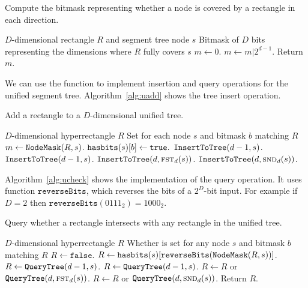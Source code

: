 \documentclass[english,gradu]{tktltiki2018}
\begin{document}
\begin{algorithm}
\caption{Compute the bitmask representing whether a node is covered by a rectangle in each direction.}\label{alg:maskof}
\begin{algorithmic}
\Require $D$-dimensional rectangle $R$ and segment tree node $s$
\Ensure Bitmask of $D$ bits representing the dimensions where $R$ fully covers $s$
	\State $m\gets 0$.
			\State $m\gets m | 2^{d-1}$.
		\EndIf
	\EndFor
	\State Return $m$.
\EndProcedure
\end{algorithmic}
\end{algorithm}

We can use the \maskoff function to implement insertion and query operations for the unified segment tree.
Algorithm~\ref{alg:uadd} shows the tree insert operation.

\begin{algorithm}
\caption{Add a rectangle to a $D$-dimensional unified tree.}\label{alg:uadd}
\begin{algorithmic}
\Require $D$-dimensional hyperrectangle $R$
\Ensure Set  for each node $s$ and bitmask $b$ matching $R$
		\State $m\gets\texttt{NodeMask}(R,s)$.
				\State $\texttt{hasbits}(s)[b]\gets\texttt{true}.$
			\EndIf
		\EndFor
		\State $\texttt{InsertToTree}(d-1,s)$.
		\State $\texttt{InsertToTree}(d-1,s)$.
		\State $\texttt{InsertToTree}(d,\textsc{fst}_{d}(s))$.
		\State $\texttt{InsertToTree}(d,\textsc{snd}_{d}(s))$.
	\EndIf
\EndProcedure
\end{algorithmic}
\end{algorithm}

Algorithm~\ref{alg:ucheck} shows the implementation of the query operation.
It uses function $\texttt{reverseBits}$, which reverses the bits of a $2^D$-bit input.
For example if $D=2$ then $\texttt{reverseBits}(0111_2)=1000_2$.

\begin{algorithm}
\caption{Query whether a rectangle intersects with any rectangle in the unified tree.}\label{alg:ucheck}
\begin{algorithmic}
\Require $D$-dimensional hyperrectangle $R$
\Ensure Whether  is set for any node $s$ and bitmask $b$ matching $R$
	\State $R\gets\texttt{false}$.
		\State $R\gets\texttt{hasbits}(s)[\texttt{reverseBits}(\texttt{NodeMask}(R,s))]$.
		\State $R\gets\texttt{QueryTree}(d-1,s)$.
		\State $R\gets\texttt{QueryTree}(d-1,s)$.
		\State $R\gets R$ or $\texttt{QueryTree}(d,\textsc{fst}_{d}(s))$.
		\State $R\gets R$ or $\texttt{QueryTree}(d,\textsc{snd}_{d}(s))$.
	\EndIf
	\State Return $R$.
\EndProcedure
\end{algorithmic}
\end{algorithm}
\end{document}
